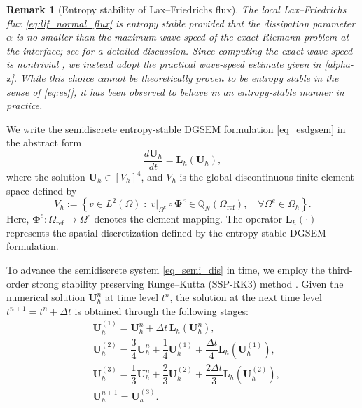 \documentclass[fleqn,11pt]{amsart}
\newtheorem{remark}{Remark}[section]
\begin{document}
\begin{remark}[Entropy stability of Lax--Friedrichs flux]
The local Lax--Friedrichs flux \eqref{eq:llf_normal_flux} is entropy stable provided that the dissipation parameter $\alpha$ is no smaller than the maximum wave speed of the exact Riemann problem at the interface; see \cite{chen2017entropy} for a detailed discussion.
Since computing the exact wave speed is nontrivial \cite{GuermondPopov16}, we instead adopt the practical wave-speed estimate given in \eqref{alpha-x}.
While this choice cannot be theoretically proven to be entropy stable in the sense of \eqref{eq:esf}, it has been observed to behave in an entropy-stable manner in practice.
\end{remark}


We write the semidiscrete entropy-stable DGSEM formulation \eqref{eq_esdgsem} in the abstract form
\begin{equation}
\label{eq_semi_dis}
\frac{d\bm U_h}{dt}
=
\bm L_h(\bm U_h),
\end{equation}
where the solution \(\bm U_h \in [V_h]^4\), and \(V_h\) is the global discontinuous finite element space defined by
\[
V_h := \left\{
v \in L^2(\Omega) \;:\;
\left. v \right|_{\Omega^e} \circ \bm \Phi^e \in \mathbb{Q}_N(\Omega_{\mathrm{ref}}),
\quad \forall \Omega^e \in \Omega_h
\right\}.
\]
Here, \(\bm \Phi^e : \Omega_{\mathrm{ref}} \to \Omega^e\) denotes the element mapping. The operator \(\bm L_h(\cdot)\) represents the spatial discretization defined by the entropy-stable DGSEM formulation.

To advance the semidiscrete system \eqref{eq_semi_dis} in time, we employ the
third-order strong stability preserving Runge--Kutta (SSP-RK3) method
\cite{gottlieb2001strong}.
Given the numerical solution $\bm U_h^{n}$ at time level $t^n$, the solution
at the next time level $t^{n+1}=t^n+\Delta t$ is obtained through the following
stages:
\begin{equation}
\label{eq_RK3}
\begin{aligned}
& \bm U_h^{(1)}
=
\bm U_h^{n}
+
\Delta t\,\bm L_h(\bm U_h^{n}), \\
& \bm U_h^{(2)}
=
\dfrac{3}{4}\bm U_h^{n}
+
\dfrac{1}{4}\bm U_h^{(1)}
+
\dfrac{\Delta t}{4}\bm L_h(\bm U_h^{(1)}), \\
& \bm U_h^{(3)}
=
\dfrac{1}{3}\bm U_h^{n}
+
\dfrac{2}{3}\bm U_h^{(2)}
+
\dfrac{2\Delta t}{3}\bm L_h(\bm U_h^{(2)}), \\
& \bm U_h^{n+1}
=
\bm U_h^{(3)}.
\end{aligned}
\end{equation}
\end{document}
